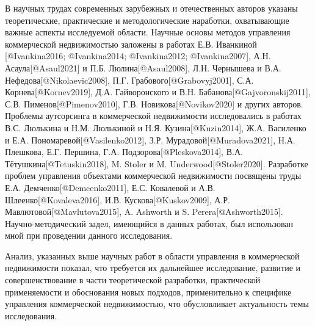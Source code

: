 В научных трудах современных зарубежных и отечественных авторов указаны теоретические, практические и методологические наработки, охватывающие важные аспекты исследуемой области. Научные основы методов управления коммерческой недвижимостью заложены в работах Е.В. Иванкиной [@Ivankina2016; @Ivankina2014; @Ivankina2012; @Ivankina2007], А.Н. Асаула[@Asaul2021] и П.Б. Люлина[@Asaul2008], Л.Н. Чернышева и В.А. Нефедова[@Nikolaevic2008], П.Г. Грабового[@Grabovyj2001], С.А. Корнева[@Kornev2019], Д.А. Гайворонского и В.Н. Бабанова[@Gajvoronskij2011], С.В. Пименов[@Pimenov2010], Г.В. Новикова[@Novikov2020] и других авторов. Проблемы аутсорсинга в коммерческой недвижимости исследовались в работах В.С. Люлькина и Н.М. Люлькиной и Н.Я. Кузина[@Kuzin2014], Ж.А. Василенко и Е.А. Пономаревой[@Vasilenko2012], З.Р. Мурадовой[@Muradova2021], Н.А. Плешкова, Е.Г. Першина, Г.А. Подзорова[@Pleskova2014], В.А. Тётушкина[@Tetuskin2018], M. Stoler и M. Underwood[@Stoler2020]. Разработке проблем управления объектами коммерческой недвижимости посвящены труды Е.А. Демченко[@Demcenko2011], Е.С. Ковалевой и А.В. Шлеенко[@Kovaleva2016], И.В. Кускова[@Kuskov2009], А.Р. Мавлютовой[@Mavlutova2015], A. Ashworth и S. Perera[@Ashworth2015]. Научно-методический задел, имеющийся в данных работах, был использован мной при проведении данного исследования.

Анализ, указанных выше научных работ в области управления в коммерческой недвижимости показал, что требуется их дальнейшее исследование, развитие и совершенствование в части теоретической разработки, практической применяемости и обоснования новых подходов, применительно к специфике управления коммерческой недвижимостью, что обусловливает актуальность темы исследования.


